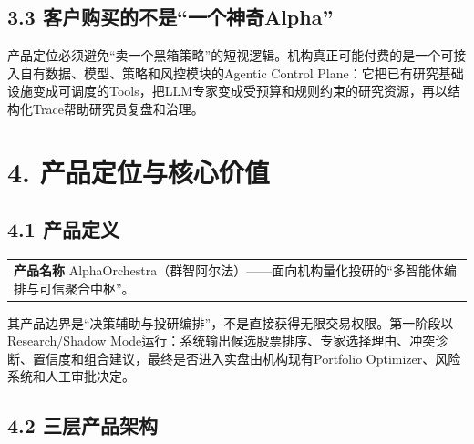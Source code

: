 \documentclass[12pt,a4paper]{ctexart}
\begin{document}
\subsection{\texorpdfstring{\textbf{3.3
客户购买的不是``一个神奇Alpha''}}{3.3 客户购买的不是``一个神奇Alpha''}}\label{ux5ba2ux6237ux8d2dux4e70ux7684ux4e0dux662fux4e00ux4e2aux795eux5947alpha}

产品定位必须避免``卖一个黑箱策略''的短视逻辑。机构真正可能付费的是一个可接入自有数据、模型、策略和风控模块的Agentic
Control
Plane：它把已有研究基础设施变成可调度的Tools，把LLM专家变成受预算和规则约束的研究资源，再以结构化Trace帮助研究员复盘和治理。

\section{\texorpdfstring{\textbf{4.
产品定位与核心价值}}{4. 产品定位与核心价值}}\label{ux4ea7ux54c1ux5b9aux4f4dux4e0eux6838ux5fc3ux4ef7ux503c}

\subsection{\texorpdfstring{\textbf{4.1
产品定义}}{4.1 产品定义}}\label{ux4ea7ux54c1ux5b9aux4e49}

\begin{longtable}[]{@{}
  >{\raggedright\arraybackslash}p{}@{}}
\toprule\noalign{}
\endhead
\bottomrule\noalign{}
\endlastfoot
\textbf{产品名称}
AlphaOrchestra（群智阿尔法）------面向机构量化投研的``多智能体编排与可信聚合中枢''。 \\
\end{longtable}

其产品边界是``决策辅助与投研编排''，不是直接获得无限交易权限。第一阶段以Research/Shadow
Mode运行：系统输出候选股票排序、专家选择理由、冲突诊断、置信度和组合建议，最终是否进入实盘由机构现有Portfolio
Optimizer、风险系统和人工审批决定。

\subsection{\texorpdfstring{\textbf{4.2
三层产品架构}}{4.2 三层产品架构}}\label{ux4e09ux5c42ux4ea7ux54c1ux67b6ux6784}
\end{document}
